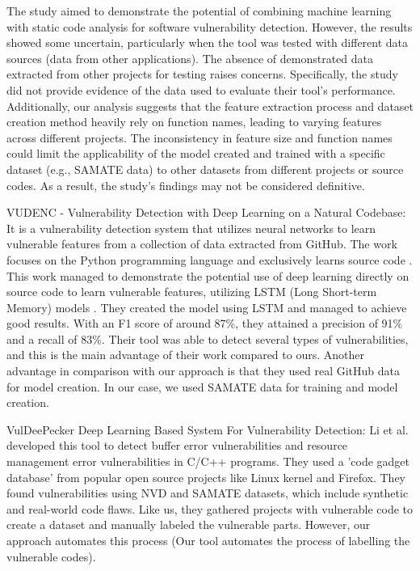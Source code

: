 \documentclass[journal,a4paper]{IEEEtran}
\begin{document}
The study aimed to demonstrate the potential of combining machine learning with static code analysis for software vulnerability detection. However, the results showed some uncertain, particularly when the tool was tested with different data sources (data from other applications). The absence of demonstrated data extracted from other projects for testing raises concerns. Specifically, the study did not provide evidence of the data used to evaluate their tool's performance. Additionally, our analysis suggests that the feature extraction process and dataset creation method heavily rely on function names, leading to varying features across different projects. The inconsistency in feature size and function names could limit the applicability of the model created and trained with a specific dataset (e.g., SAMATE data) to other datasets from different projects or source codes. As a result, the study's findings may not be considered definitive.

VUDENC - Vulnerability Detection with Deep Learning on a Natural Codebase: It is a vulnerability detection system that utilizes neural networks to learn vulnerable features from a collection of data extracted from GitHub. The work focuses on the Python programming language and exclusively learns source code \cite{Wartschinski2019}.
This work managed to demonstrate the potential use of deep learning directly on source code to learn vulnerable features, utilizing LSTM (Long Short-term Memory) models \cite{article_LSTM}.
They created the model using LSTM and managed to achieve good results. With an F1 score of around 87\%, they attained a precision of 91\% and a recall of 83\%.
Their tool was able to detect several types of vulnerabilities, and this is the main advantage of their work compared to ours. Another advantage in comparison with our approach is that they used real GitHub data for model creation. In our case, we used SAMATE data for training and model creation.

VulDeePecker Deep Learning Based System For Vulnerability Detection: Li et al. \cite{Zhen_Li2018} developed this tool  to detect buffer error vulnerabilities and resource management error vulnerabilities in C/C++ programs. They used a 'code gadget database' from popular open source projects like Linux kernel and Firefox. They found vulnerabilities using NVD and SAMATE datasets, which include synthetic and real-world code flaws. Like us, they gathered projects with vulnerable code to create a dataset and manually labeled the vulnerable parts. However, our approach automates this process (Our tool automates the process of labelling the vulnerable codes).
\end{document}
